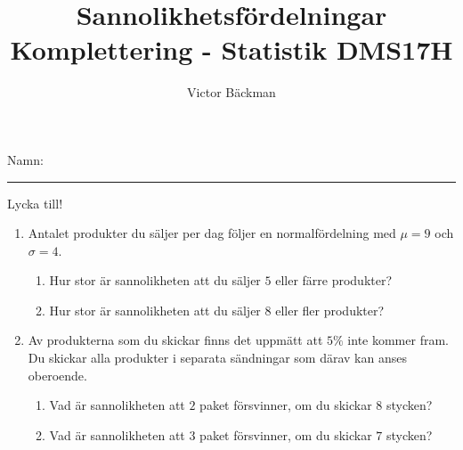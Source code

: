 \documentclass[a4paper,10pt]{article}
\title{Sannolikhetsfördelningar \\ {\large Komplettering - Statistik DMS17H}}
\author{Victor Bäckman}
\begin{document}
\thispagestyle{empty}
\maketitle
\vspace{2cm}
Namn:
{\rule{13cm}{0.4pt}}
\vspace{8cm}
\begin{center}
  {\huge Lycka till!}
\end{center}
\newpage
\begin{enumerate}
  \item{Antalet produkter du säljer per dag följer en normalfördelning med $\mu = 9$ och $\sigma=4$.}
    \begin{enumerate}
      \item{Hur stor är sannolikheten att du säljer $5$ eller färre produkter?}
      \vspace{10cm}
      \item{Hur stor är sannolikheten att du säljer $8$ eller fler produkter?}
    \end{enumerate}
    \newpage
  \item{Av produkterna som du skickar finns det uppmätt att $5\%$ inte kommer fram. Du skickar alla produkter i separata sändningar som därav kan anses oberoende.}
    \begin{enumerate}
        \item{Vad är sannolikheten att $2$ paket försvinner, om du skickar $8$ stycken?}
        \vspace{10cm}
        \item{Vad är sannolikheten att $3$ paket försvinner, om du skickar $7$ stycken?}
    \end{enumerate}
\end{enumerate}
\end{document}
